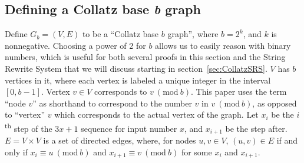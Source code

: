 \documentclass[12pt]{article}
\newcommand{\Mod}[1]{\ (\mathrm{mod}\ #1)}
\theoremstyle{definition}
\begin{document}
\subsection{Defining a Collatz base \textit{b} graph} \label{subsec:colgraph}
Define $G_b=(V,E)$ to be a ``Collatz base $b$ graph'', where $b = 2^k$, and $k$ is nonnegative. Choosing a power of 2 for $b$ allows us to easily reason with binary numbers, which is useful for both several proofs in this section and the String Rewrite System that we will discuss starting in section~\ref{sec:CollatzSRS}. $V$ has $b$ vertices in it, where each vertex is labeled a unique integer in the interval $[0, b-1]$. Vertex $v \in V$ corresponds to $v \Mod{b}$. This paper uses the term ``node $v$'' as shorthand to correspond to the number $v$ in $v \Mod{b}$, as opposed to ``vertex'' $v$ which corresponds to the actual vertex of the graph. Let $x_i$ be the $i$\textsuperscript{th} step of the $3x+1$ sequence for input number $x$, and $x_{i+1}$ be the step after. $E = V \times V$ is a set of directed edges, where, for nodes $u, v \in V$, $(u,v) \in E$ if and only if $x_i \equiv u \Mod{b}$ and $x_{i+1} \equiv v \Mod{b}$ for some $x_i$ and $x_{i+1}$. \par
\end{document}
